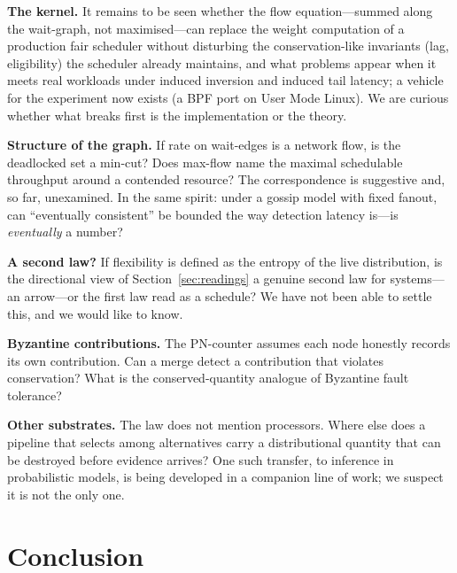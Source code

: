 \documentclass[11pt]{article}
\begin{document}
\textbf{The kernel.} It remains to be seen whether the flow
equation---summed along the wait-graph, not maximised---can replace
the weight computation of a production fair scheduler without
disturbing the conservation-like invariants (lag, eligibility) the
scheduler already maintains, and what problems appear when it meets
real workloads under induced inversion and induced tail latency; a
vehicle for the experiment now exists (a BPF port on User Mode Linux). We
are curious whether what breaks first is the implementation or the
theory.

\textbf{Structure of the graph.} If rate on wait-edges is a network
flow, is the deadlocked set a min-cut? Does max-flow name the maximal
schedulable throughput around a contended resource? The
correspondence is suggestive and, so far, unexamined. In the same
spirit: under a gossip model with fixed fanout, can ``eventually
consistent'' be bounded the way detection latency is---is
\emph{eventually} a number?

\textbf{A second law?} If flexibility is defined as the entropy of
the live distribution, is the directional view of
Section~\ref{sec:readings} a genuine second law for systems---an
arrow---or the first law read as a schedule? We have not been able to
settle this, and we would like to know.

\textbf{Byzantine contributions.} The PN-counter assumes each node
honestly records its own contribution. Can a merge detect a
contribution that violates conservation? What is the
conserved-quantity analogue of Byzantine fault tolerance?

\textbf{Other substrates.} The law does not mention processors. Where
else does a pipeline that selects among alternatives carry a
distributional quantity that can be destroyed before evidence
arrives? One such transfer, to inference in probabilistic models, is
being developed in a companion line of work; we suspect it is not the
only one.

\section{Conclusion}
\label{sec:conclusion}
\end{document}
